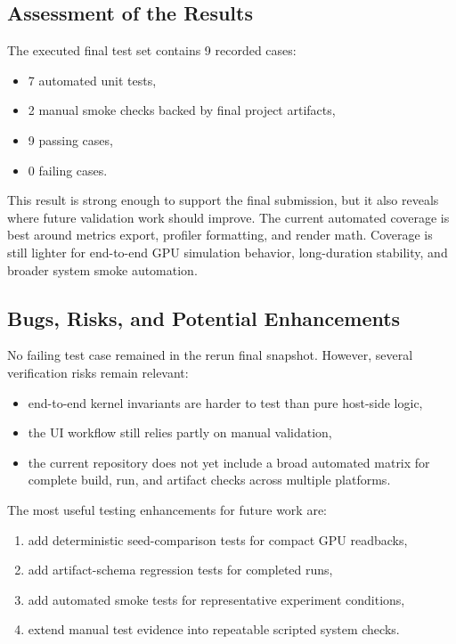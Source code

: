 \subsection{Assessment of the Results}

The executed final test set contains 9 recorded cases:

\begin{itemize}[nosep]
  \item 7 automated unit tests,
  \item 2 manual smoke checks backed by final project artifacts,
  \item 9 passing cases,
  \item 0 failing cases.
\end{itemize}

This result is strong enough to support the final submission, but it also reveals where future
validation work should improve. The current automated coverage is best around metrics export,
profiler formatting, and render math. Coverage is still lighter for end-to-end GPU simulation
behavior, long-duration stability, and broader system smoke automation.

\subsection{Bugs, Risks, and Potential Enhancements}

No failing test case remained in the rerun final snapshot. However, several verification risks
remain relevant:

\begin{itemize}[nosep]
  \item end-to-end kernel invariants are harder to test than pure host-side logic,
  \item the UI workflow still relies partly on manual validation,
  \item the current repository does not yet include a broad automated matrix for complete build,
    run, and artifact checks across multiple platforms.
\end{itemize}

The most useful testing enhancements for future work are:

\begin{enumerate}[nosep]
  \item add deterministic seed-comparison tests for compact GPU readbacks,
  \item add artifact-schema regression tests for completed runs,
  \item add automated smoke tests for representative experiment conditions,
  \item extend manual test evidence into repeatable scripted system checks.
\end{enumerate}
